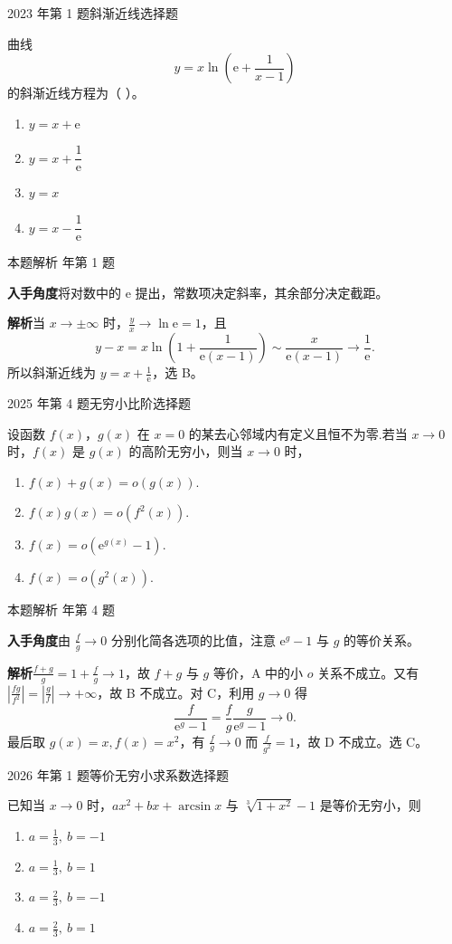 \documentclass[UTF8,zihao=-4,fontset=fandol]{ctexart}
\newenvironment{abcd}{\begin{enumerate}[label=\textup{(\Alph*)},leftmargin=2.3em,itemsep=1pt,topsep=4pt,parsep=1pt]}{\end{enumerate}}
\newcommand{\choices}[4]{%
  \begin{abcd}
    \item #1
    \item #2
    \item #3
    \item #4
  \end{abcd}}
\newcommand{\QuestionPage}[6]{%
  \par\noindent\begin{minipage}{\linewidth}
  \raggedright
  {\small\textcolor{black!60}{#3\quad #5}\hfill\textcolor{accent}{#2}}\par\smallskip}
\newcommand{\QuestionEnd}{\end{minipage}\par\medskip}
\newcommand{\QuestionPage}[6]{%
  \clearpage
  {\small\textcolor{accent}{#1\hfill #2}}\par\medskip
  {\small\textcolor{black!60}{#3\quad #5\hfill #6}}\par\vspace{9bp}}
\newcommand{\QuestionEnd}{}
\newenvironment{QuestionSolution}[1]{%
  \clearpage
  {\small\textcolor{black!60}{本题解析\quad #1}}\par\medskip
}{\par\clearpage}
\begin{document}
\QuestionPage{1.4 无穷小量与无穷大量}{选择题}{2023 年第 1 题}{1}{斜渐近线}{028 / 234}
曲线
\[y=x\ln\left(\mathrm{e}+\frac{1}{x-1}\right)
\]
的斜渐近线方程为（ ）。
\choices{\(y=x+\mathrm{e}\)}{\(y=x+\dfrac{1}{\mathrm{e}}\)}{\(y=x\)}{\(y=x-\dfrac{1}{\mathrm{e}}\)}
\QuestionEnd

\begin{QuestionSolution}{2023 年第 1 题}
\textbf{入手角度}\quad 将对数中的 \(\mathrm{e}\) 提出，常数项决定斜率，其余部分决定截距。

\textbf{解析}\quad 当 \(x\to\pm\infty\) 时，\(\frac{y}{x}\to\ln \mathrm{e}=1\)，且
\[
y-x=x\ln\left(1+\frac{1}{\mathrm{e}(x-1)}\right)
\sim\frac{x}{\mathrm{e}(x-1)}\longrightarrow\frac{1}{\mathrm{e}}.
\]
所以斜渐近线为 \(\boxed{y=x+\frac{1}{\mathrm{e}}}\)，选 B。
\end{QuestionSolution}

\QuestionPage{1.4 无穷小量与无穷大量}{选择题}{2025 年第 4 题}{1}{无穷小比阶}{029 / 234}
设函数 \(f\left( x \right)\)，\(g\left( x \right)\) 在 \(x = 0\) 的某去心邻域内有定义且恒不为零.若当 \(x \to 0\) 时，\(f\left( x \right)\) 是 \(g\left( x \right)\) 的高阶无穷小，则当 \(x \to 0\) 时，
\choices{\(f\left( x \right) + g\left( x \right) = o\left( g\left( x \right) \right)\).}{\(f\left( x \right) g\left( x \right) = o\left( f^{2}\left( x \right) \right)\).}{\(f\left( x \right) = o\left( \mathrm{e}^{g\left( x \right)} - 1 \right)\).}{\(f\left( x \right) = o\left( g^{2}\left( x \right) \right)\).}
\QuestionEnd

\begin{QuestionSolution}{2025 年第 4 题}
\textbf{入手角度}\quad 由 \(\frac{f}{g}\to0\) 分别化简各选项的比值，注意 \(\mathrm{e}^g-1\) 与 \(g\) 的等价关系。

\textbf{解析}\quad \(\frac{f+g}{g}=1+\frac{f}{g}\to1\)，故 \(f+g\) 与 \(g\) 等价，A 中的小 \(o\) 关系不成立。又有 \(|\frac{fg}{f^2}|=|\frac{g}{f}|\to+\infty\)，故 B 不成立。对 C，利用 \(g\to0\) 得
\[
\frac{f}{\mathrm{e}^g-1}=\frac fg\frac g{\mathrm{e}^g-1}\longrightarrow0.
\]
最后取 \(g(x)=x,f(x)=x^2\)，有 \(\frac{f}{g}\to0\) 而 \(\frac{f}{g^2}=1\)，故 D 不成立。选 C。
\end{QuestionSolution}

\QuestionPage{1.4 无穷小量与无穷大量}{选择题}{2026 年第 1 题}{1}{等价无穷小求系数}{030 / 234}
已知当 \(x \to 0\) 时，\(a x^{2} + b x + \arcsin x\) 与 \(\sqrt[3]{1 + x^{2}} - 1\) 是等价无穷小，则
\choices{\(a = \frac{1}{3},\ b = -1\)}{\(a = \frac{1}{3},\ b = 1\)}{\(a = \frac{2}{3},\ b = -1\)}{\(a = \frac{2}{3},\ b = 1\)}
\QuestionEnd
\end{document}
